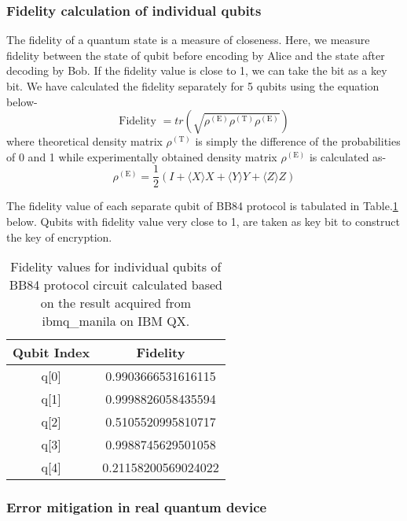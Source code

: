\documentclass[superscriptaddress,twocolumn,showpacs,prb,floatfix]{revtex4}
\begin{document}
\subsubsection{Fidelity calculation of individual qubits}
\label{SecIIAiii}
The fidelity of a quantum state is a measure of closeness. Here, we measure fidelity between the state of qubit before encoding by Alice and the state after decoding by Bob. If the fidelity value is close to 1, we can take the bit as a key bit. We have calculated the fidelity separately for 5 qubits using the equation below\cite{Jozsa1994}-
\begin{equation}
\textrm{Fidelity }= tr(\sqrt{\rho^{(\text{E})}\rho^{(\text{T})}\rho^{(\text{E})}})
\end{equation}
where  theoretical density matrix $\rho^{(\text{T})}$ is simply the difference of the probabilities of 0 and 1 while experimentally obtained density matrix $\rho^{(\text{E})}$ is calculated as\cite{BKbehera}-
\begin{equation}
\rho^{(\text{E})}=\frac{1}{2}(I+\langle X\rangle X +\langle Y\rangle Y+\langle Z\rangle Z)
\end{equation}

The fidelity value of each separate qubit of BB84 protocol is tabulated in  Table.\ref{fid_table} below. Qubits with fidelity value very close to 1, are taken as key bit to construct the key of encryption.
\begin{table}[ht]
    \centering
    \begin{tabular}{|c|c|}
    \hline
    \hline
    Qubit Index & Fidelity \\[0.5ex]
    \hline
    q[0] & 0.9903666531616115  \\[0.5ex]
    \hline
    q[1] & 0.9998826058435594  \\[0.5ex]
    \hline
    q[2] & 0.5105520995810717  \\[0.5ex]
    \hline
    q[3] & 0.9988745629501058 \\[0.5ex]
    \hline
    q[4] & 0.21158200569024022  \\[0.5ex]
    \hline
    \end{tabular}
    \caption{Fidelity values for individual qubits of BB84 protocol circuit calculated based on the result acquired from ibmq\_manila on IBM QX.}
    \label{fid_table}
\end{table}


\subsubsection{Error mitigation in real quantum device}
\label{SecIIAiv}
\end{document}
